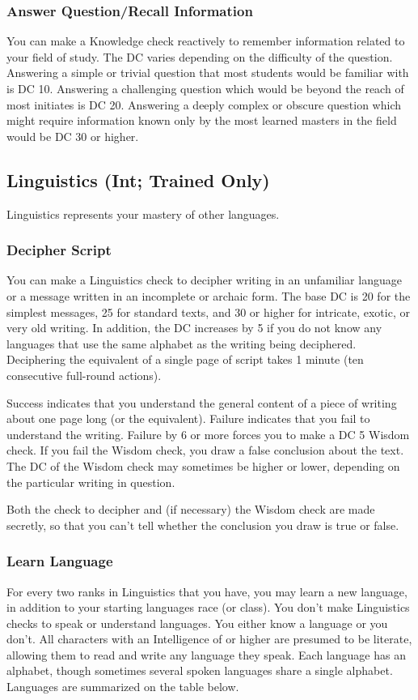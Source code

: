 \subsubsection{Answer Question/Recall Information}
You can make a Knowledge check reactively to remember information related to your field of study. The DC varies depending on the difficulty of the question. Answering a simple or trivial question that most students would be familiar with is DC 10. Answering a challenging question which would be beyond the reach of most initiates is DC 20. Answering a deeply complex or obscure question which might require information known only by the most learned masters in the field would be DC 30 or higher.

\subsection{Linguistics (Int; Trained Only)}
Linguistics represents your mastery of other languages.

\subsubsection{Decipher Script}
You can make a Linguistics check to decipher writing in an unfamiliar language or a message written in an incomplete or archaic form. The base DC is 20 for the simplest messages, 25 for standard texts, and 30 or higher for intricate, exotic, or very old writing. In addition, the DC increases by 5 if you do not know any languages that use the same alphabet as the writing being deciphered. Deciphering the equivalent of a single page of script takes 1 minute (ten consecutive full-round actions).

Success indicates that you understand the general content of a piece of writing about one page long (or the equivalent). Failure indicates that you fail to understand the writing. Failure by 6 or more forces you to make a DC 5 Wisdom check. If you fail the Wisdom check, you draw a false conclusion about the text. The DC of the Wisdom check may sometimes be higher or lower, depending on the particular writing in question.

Both the check to decipher and (if necessary) the Wisdom check are made secretly, so that you can't tell whether the conclusion you draw is true or false.

\subsubsection{Learn Language}
For every two ranks in Linguistics that you have, you may learn a new language, in addition to your starting languages race (or class). You don't make Linguistics checks to speak or understand languages. You either know a language or you don't. All characters with an Intelligence of  or higher are presumed to be literate, allowing them to read and write any language they speak. Each language has an alphabet, though sometimes several spoken languages share a single alphabet. Languages are summarized on the table below.

